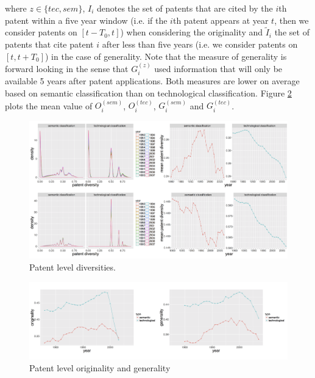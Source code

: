 \documentclass[article]{article}%
\begin{document}
where $z \in \{tec, sem\}$, $I_i$ denotes the set of patents that are cited by the $i$th patent within a five year window (i.e. if the $i$th patent appears at year $t$, then we consider patents on $[t-T_0, t]$) when considering the originality and $\tilde{I}_i$ the set of patents that cite patent $i$ after less than five years (i.e. we consider patents on $[t ,t + T_0]$) in the case of generality. Note that the measure of generality is forward looking in the sense that $G_i^{(z)}$ used information that will only be available 5 years after patent applications. Both measures are lower on average based on semantic classification than on technological classification. Figure \ref{fig:orig-gene} plots the mean value of $O_i^{(sem)}$, $O_i^{(tec)}$, $G_i^{(sem)}$ and $G_i^{(tec)}$.

\begin{figure}
\includegraphics[width=\textwidth]{figures/Fig5}
\caption{Patent level diversities.} 
\label{fig:patent-level-orig}
\end{figure}
\begin{figure}
\includegraphics[width=\textwidth]{figures/Fig6}
\caption{Patent level originality and generality} 
\label{fig:orig-gene}
\end{figure}
\end{document}
